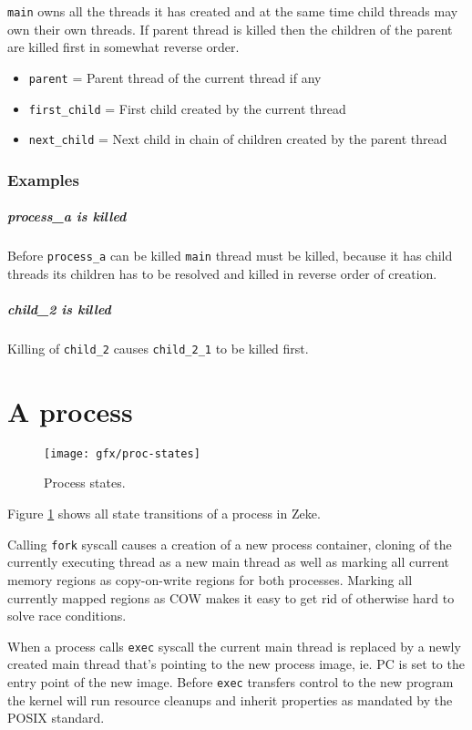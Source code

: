 \verb+main+ owns all the threads it has created and at the same time child
threads may own their own threads. If parent thread is killed then the
children of the parent are killed first in somewhat reverse order.

\begin{itemize}
  \item \verb+parent+ = Parent thread of the current thread if any
  \item \verb+first_child+ = First child created by the current thread
  \item \verb+next_child+ = Next child in chain of children created by the
        parent thread
\end{itemize}

\subsubsection{Examples}

\subparagraph*{process\_a is killed}

Before \verb+process_a+ can be killed \verb+main+ thread must be killed,
because it has child threads its children has to be resolved and killed in
reverse order of creation.

\subparagraph*{child\_2 is killed}

Killing of \verb+child_2+ causes \verb+child_2_1+ to be killed first.

\section{A process}

\begin{figure}
  \center
  \texttt{[image: gfx/proc-states]}
  \caption{Process states.}
  \label{figure:procstates}
\end{figure}

Figure \ref{figure:procstates} shows all state transitions
of a process in Zeke.

Calling \verb+fork+ syscall causes a creation of a new process container,
cloning of the currently executing thread as a new main thread as well as
marking all current memory regions as copy-on-write regions for both processes.
Marking all currently mapped regions as COW makes it easy to get rid of
otherwise hard to solve race conditions.

When a process calls \verb+exec+ syscall the current main thread is replaced by
a newly created main thread that's pointing to the new process image, ie.
\acs{PC} is set to the entry point of the new image. Before \verb+exec+
transfers control to the new program the kernel will run resource cleanups and
inherit properties as mandated by the \acs{POSIX} standard.
